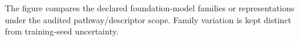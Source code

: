 The figure compares the declared foundation-model families or representations under the audited pathway/descriptor scope. Family variation is kept distinct from training-seed uncertainty.
